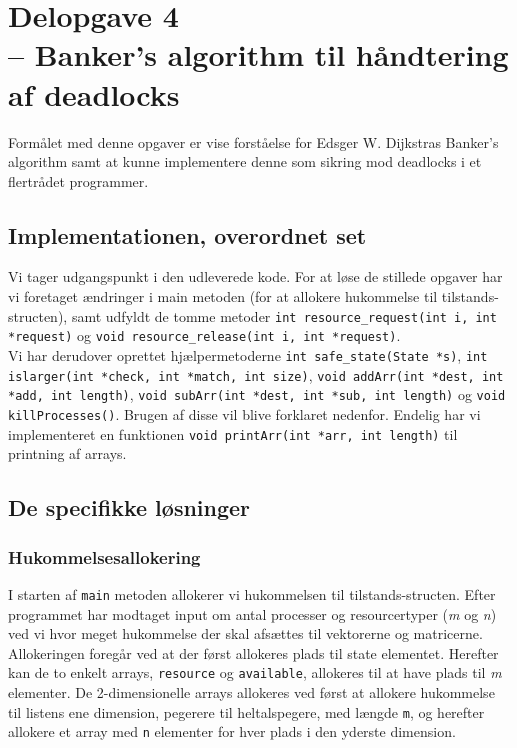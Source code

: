 \documentclass[main.tex]{subfile}
\begin{document}
\section{Delopgave 4\\\normalsize{-- Banker's algorithm til håndtering af deadlocks}}
Formålet med denne opgaver er vise forståelse for Edsger W. Dijkstras Banker’s algorithm samt at kunne implementere denne som sikring mod deadlocks i et flertrådet programmer.

\subsection{Implementationen, overordnet set}
Vi tager udgangspunkt i den udleverede kode. For at løse de stillede opgaver har vi foretaget ændringer i main metoden (for at allokere hukommelse til tilstands-structen), samt udfyldt de tomme metoder \texttt{int resource\_request(int i, int *request)} og \texttt{void resource\_release(int i, int *request)}.\\

Vi har derudover oprettet hjælpermetoderne \texttt{int safe\_state(State *s)}, \texttt{int islarger(int *check, int *match, int size)}, \texttt{void addArr(int *dest, int *add, int length)}, \texttt{void subArr(int *dest, int *sub, int length)} og \texttt{void killProcesses()}. Brugen af disse vil blive forklaret nedenfor. Endelig har vi implementeret en funktionen \texttt{void printArr(int *arr, int length)} til printning af arrays.

\subsection{De specifikke løsninger}

\subsubsection{Hukommelsesallokering}
I starten af \texttt{main} metoden allokerer vi hukommelsen til tilstands-structen. Efter programmet har modtaget input om antal processer og resourcertyper (\textit{m} og \textit{n}) ved vi hvor meget hukommelse der skal afsættes til vektorerne og matricerne. Allokeringen foregår ved at der først allokeres plads til state elementet. Herefter kan de to enkelt arrays, \texttt{resource} og \texttt{available}, allokeres til at have plads til \emph{m} elementer. De 2-dimensionelle arrays allokeres ved først at allokere hukommelse til listens ene dimension, pegerere til heltalspegere, med længde \texttt{m}, og herefter allokere et array med \texttt{n} elementer for hver plads i den yderste dimension.
\end{document}
